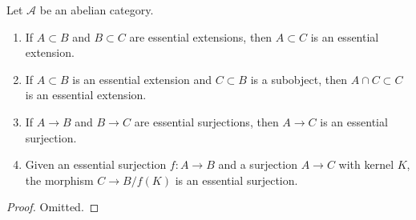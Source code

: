 \begin{lemma}
\label{lemma-essential}
Let $\mathcal{A}$ be an abelian category.
\begin{enumerate}
\item If $A \subset B$ and $B \subset C$ are essential extensions, then
$A \subset C$ is an essential extension.
\item If $A \subset B$ is an essential extension and $C \subset B$
is a subobject, then $A \cap C \subset C$ is an essential extension.
\item If $A \to B$ and $B \to C$ are essential surjections, then
$A \to C$ is an essential surjection.
\item Given an essential surjection $f : A \to B$ and a surjection
$A \to C$ with kernel $K$, the morphism $C \to B/f(K)$ is an essential
surjection.
\end{enumerate}
\end{lemma}

\begin{proof}
Omitted.
\end{proof}
